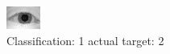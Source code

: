 \begin{figure}[h!]
\begin{center}
\includegraphics[width=0.60\columnwidth]{figures/ID934_class_1_target_2.png}
\end{center}
\caption{ Classification: 1 actual target: 2}
\label{fig:ID934_class_1_target_2}
\end{figure}
